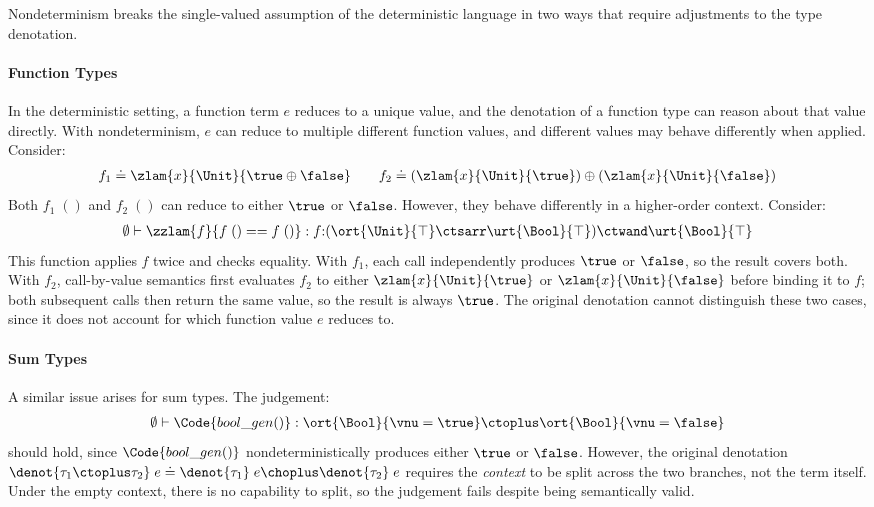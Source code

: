 Nondeterminism breaks the single-valued assumption of the deterministic
language in two ways that require adjustments to the type denotation.

\paragraph{Function Types}
In the deterministic setting, a function term $e$ reduces to a unique
value, and the denotation of a function type can reason about that
value directly.  With nondeterminism, $e$ can reduce to multiple
different function values, and different values may behave differently
when applied.  Consider:
\begin{align*}
  f_1 \doteq \zlam{x}{\Unit}{\true \oplus \false}
  \qquad
  f_2 \doteq (\zlam{x}{\Unit}{\true}) \oplus (\zlam{x}{\Unit}{\false})
\end{align*}
Both $f_1\;()$ and $f_2\;()$ can reduce to either $\true$ or $\false$.
However, they behave differently in a higher-order context.  Consider:
\begin{align*}
  \emptyset \vdash \zzlam{f}{f\;() == f\;()} :
  f{:}(\ort{\Unit}{\top} \ctsarr \urt{\Bool}{\top}) \ctwand
  \urt{\Bool}{\top}
\end{align*}
This function applies $f$ twice and checks equality.  With $f_1$,
each call independently produces $\true$ or $\false$, so the result
covers both.  With $f_2$, call-by-value semantics first evaluates
$f_2$ to either $\zlam{x}{\Unit}{\true}$ or $\zlam{x}{\Unit}{\false}$
before binding it to $f$; both subsequent calls then return the same
value, so the result is always $\true$.  The original denotation
cannot distinguish these two cases, since it does not account for
which function value $e$ reduces to.

\paragraph{Sum Types}
A similar issue arises for sum types.  The judgement:
\begin{align*}
  \emptyset \vdash \Code{bool\_gen()} :
  \ort{\Bool}{\vnu = \true} \ctoplus \ort{\Bool}{\vnu = \false}
\end{align*}
should hold, since $\Code{bool\_gen()}$ nondeterministically produces
either $\true$ or $\false$.  However, the original denotation
$\denot{\tau_1 \ctoplus \tau_2}\;e \doteq \denot{\tau_1}\;e \choplus
\denot{\tau_2}\;e$ requires the \emph{context} to be split across the
two branches, not the term itself.  Under the empty context, there is
no capability to split, so the judgement fails despite being
semantically valid.

